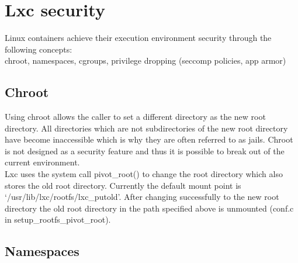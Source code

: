 \chapter{Lxc security}

Linux containers achieve their execution environment security through the following concepts:\\
chroot, namespaces, cgroups, privilege dropping (seccomp policies, app armor)\\

\section{Chroot}

Using chroot allows the caller to set a different directory as the new root directory. All directories which are not subdirectories
of the new root directory have become inaccessible which is why they are often referred to as jails. Chroot is not designed as a security
feature and thus it is possible to break out of the current environment.\\
Lxc uses the system call pivot\_root() to change the root directory which also stores the old root directory.
Currently the default mount point is `/usr/lib/lxc/rootfs/lxc\_putold'. After changing successfully to the new root directory
the old root directory in the path specified above is unmounted (conf.c in setup\_rootfs\_pivot\_root).

\section{Namespaces}


